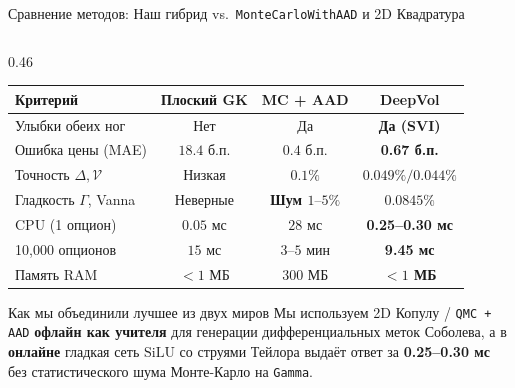 \documentclass[aspectratio=169, 9pt]{beamer}
\begin{document}
\begin{frame}{Сравнение методов: Наш гибрид vs.\ \texttt{MonteCarloWithAAD} и 2D Квадратура}
\begin{columns}[T]
    \begin{column}{0.46\textwidth}
      \begin{table}
        \centering
        \tiny
        \renewcommand{\arraystretch}{1.2}
        \begin{tabular}{@{}lccc@{}}
          \toprule
          \textbf{Критерий} & \textbf{Плоский GK} & \textbf{MC + AAD} & \textbf{DeepVol} \\
          \midrule
          \rowcolor{sberbg} Улыбки обеих ног & Нет & Да & \textbf{\color{sberemerald}Да (SVI)} \\
          Ошибка цены (MAE) & $18.4$ б.п. & $0.4$ б.п. & \textbf{\color{sberemerald}0.67 б.п.} \\
          \rowcolor{sberbg} Точность $\Delta, \mathcal{V}$ & Низкая & $0.1\%$ & \textbf{\color{sberemerald}$0.049\% / 0.044\%$} \\
          Гладкость $\Gamma$, Vanna & Неверные & \textbf{\color{sberred}Шум $1\text{--}5\%$} & \textbf{\color{sberemerald}$0.0845\%$} \\
          \rowcolor{sberbg} CPU (1 опцион) & $0.05$ мс & $28$ мс & \textbf{\color{sberemerald}0.25--0.30 мс} \\
          10,000 опционов & $15$ мс & $3\text{--}5$ мин & \textbf{\color{sberemerald}9.45 мс} \\
          \rowcolor{sberbg} Память RAM & $<1$ МБ & $300$ МБ & \textbf{\color{sberemerald}$<1$ МБ} \\
          \bottomrule
        \end{tabular}
      \end{table}

      \begin{exampleblock}{\scriptsize Как мы объединили лучшее из двух миров}
        \scriptsize Мы используем 2D Копулу / \texttt{QMC + AAD} \textbf{офлайн как учителя} для генерации дифференциальных меток Соболева, а в \textbf{онлайне} гладкая сеть $\text{SiLU}$ со струями Тейлора выдаёт ответ за \textbf{0.25--0.30 мс} без статистического шума Монте-Карло на \texttt{Gamma}.
      \end{exampleblock}
    \end{column}
  \end{columns}
\end{frame}
\end{document}
